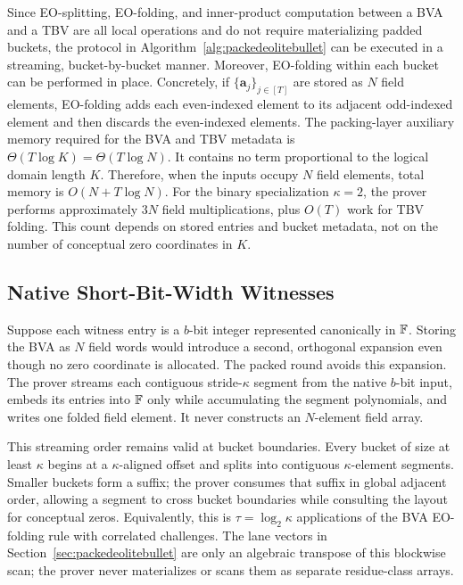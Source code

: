 Since EO-splitting, EO-folding, and inner-product computation between a BVA and a
TBV are all local operations and do not require materializing padded buckets,
the \packedeolitebullet protocol in
Algorithm~\ref{alg:packedeolitebullet} can be executed in
a streaming, bucket-by-bucket manner.
Moreover, EO-folding within each bucket can be performed in place.
Concretely, if $\{\bm{a}_j\}_{j\in[T]}$ are stored as $N$ field elements,
EO-folding adds each even-indexed element to its adjacent odd-indexed element
and then discards the even-indexed elements.
The packing-layer auxiliary memory required for the BVA and TBV metadata is
$\Theta(T\log K)=\Theta(T\log N)$.
It contains no term proportional to the logical domain length $K$.  Therefore,
when the inputs occupy $N$ field elements, total memory is $O(N+T\log N)$.
For the binary specialization $\kappa=2$, the prover performs approximately
$3N$ field multiplications, plus $O(T)$ work for TBV folding.  This count
depends on stored entries and bucket metadata, not on the number of conceptual
zero coordinates in $K$.

\subsection{Native Short-Bit-Width Witnesses}
\label{sec:short-width}

Suppose each witness entry is a $b$-bit integer represented canonically in
${\mathbb{F}}$.  Storing the BVA as $N$ field words would introduce a second,
orthogonal expansion even though no zero coordinate is allocated.  The packed
round avoids this expansion.  The prover streams each contiguous
stride-$\kappa$ segment from the native $b$-bit input, embeds its entries into
${\mathbb{F}}$ only while accumulating the segment polynomials, and writes one folded
field element.  It never constructs an $N$-element field array.

This streaming order remains valid at bucket boundaries.  Every bucket of size
at least $\kappa$ begins at a $\kappa$-aligned offset and splits into contiguous
$\kappa$-element segments.  Smaller buckets form a suffix; the prover consumes
that suffix in global adjacent order, allowing a segment to cross bucket
boundaries while consulting the layout for conceptual zeros. Equivalently,
this is $\tau=\log_2\kappa$ applications of the BVA EO-folding rule with
correlated challenges. The lane vectors in
Section~\ref{sec:packedeolitebullet} are only an algebraic transpose of this
blockwise scan; the prover never materializes or scans them as separate
residue-class arrays.

